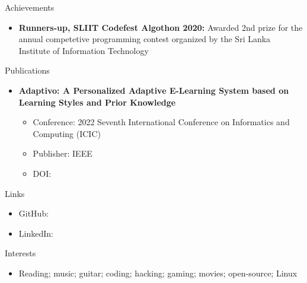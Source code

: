 \documentclass[garamond, a4paper]{modest-cv}
\begin{document}
	\begin{cvsection}{Achievements}
		\begin{cvsubsection}{}{}{}{}
			\begin{itemize}
				\item \textbf{Runners-up, SLIIT Codefest Algothon 2020:} Awarded 2nd prize for the annual competetive programming contest organized by the Sri Lanka Institute of Information Technology
			\end{itemize}
		\end{cvsubsection}
	\end{cvsection}

	\begin{cvsection}{Publications}
		\begin{cvsubsection}{}{}{}{}
			\begin{itemize}
				\item \textbf{Adaptivo: A Personalized Adaptive E-Learning System based on Learning Styles and Prior Knowledge}
				\begin{itemize}
					\item Conference: 2022 Seventh International Conference on Informatics and Computing (ICIC)
					\item Publisher: IEEE
					\item DOI: \ttfamily {}
				\end{itemize}
			\end{itemize}
		\end{cvsubsection}
	\end{cvsection}

	\begin{cvsection}{Links}
		\begin{cvsubsection}{}{}{}{}
			\begin{itemize}
				\item GitHub: \small {} \normalsize
				\item LinkedIn: \small {}
			\end{itemize}
		\end{cvsubsection}
	\end{cvsection}

	\begin{cvsection}{Interests}
		\begin{cvsubsection}{}{}{}{}
			\begin{itemize}
				\item Reading; music; guitar; coding; hacking; gaming; movies; open-source; Linux
			\end{itemize}
		\end{cvsubsection}
	\end{cvsection}
\end{document}
